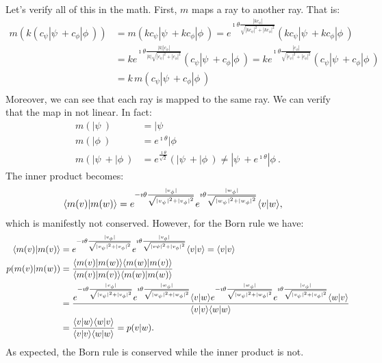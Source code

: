 Let's verify all of this in the math. First, $m$ maps a ray to another ray. That is:
\begin{equation}
	\begin{aligned}
	m(k(c_{\psi} | \psi \> + c_{\phi} | \phi \>)) &= m(kc_{\psi} | \psi \> + k c_{\phi} | \phi \>) = e^{\imath \theta \frac{|kc_{\phi}|}{\sqrt{|kc_{\psi}|^2+|kc_{\phi}|^2}}} ( k c_{\psi} | \psi \> + k c_{\phi}  | \phi \>) \\
	&= k e^{\imath \theta \frac{|k||c_{\phi}|}{|k|\sqrt{|c_{\psi}|^2+|c_{\phi}|^2}}} ( c_{\psi} | \psi \> + c_{\phi}  | \phi \>) = k e^{\imath \theta \frac{|c_{\phi}|}{\sqrt{|c_{\psi}|^2+|c_{\phi}|^2}}} \left( c_{\psi} | \psi \> + c_{\phi}  | \phi \> \right) \\
	&= k \, m(c_{\psi} | \psi \> + c_{\phi} | \phi \>) \\
	\end{aligned}
\end{equation}
Moreover, we can see that each ray is mapped to the same ray. We can verify that the map in not linear. In fact:
\begin{equation}
	\begin{aligned}
		m(|\psi\>) &= |\psi\> \\
		m(|\phi\>) &=  e^{\imath \theta} | \phi \>\\
		m(|\psi\> + |\phi\>) &= e^{\frac{\imath \theta}{\sqrt{2}}}( |\psi\> +  | \phi \>) \neq |\psi\> + e^{\imath \theta} | \phi \>.
	\end{aligned}
\end{equation}
The inner product becomes:
\begin{equation}
	\begin{aligned}
	\langle m(v) | m(w) \rangle &= e^{-\imath \theta \frac{|v_{\phi}|}{\sqrt{|v_{\psi}|^2+|v_{\phi}|^2}}} e^{\imath \theta \frac{|w_{\phi}|}{\sqrt{|w_{\psi}|^2+|w_{\phi}|^2}}} \langle v | w \rangle,
	\end{aligned}
\end{equation}
which is manifestly not conserved. However, for the Born rule we have:
\begin{equation}
	\begin{aligned}
		\langle m(v) | m(v) \rangle &= e^{-\imath \theta \frac{|v_{\phi}|}{\sqrt{|v_{\psi}|^2+|v_{\phi}|^2}}} e^{\imath \theta \frac{|v_{\phi}|}{\sqrt{|v{\psi}|^2+|v_{\phi}|^2}}} \langle v | v \rangle = \langle v | v \rangle \\
	p(m(v)|m(w)) &= \frac{\langle m(v) | m(w) \rangle\langle m(w) | m(v) \rangle}{\langle m(v) | m(v) \rangle\langle m(w) | m(w) \rangle} \\
	&= \frac{e^{-\imath \theta \frac{|v_{\phi}|}{\sqrt{|v_{\psi}|^2+|v_{\phi}|^2}}} e^{\imath \theta \frac{|w_{\phi}|}{\sqrt{|w_{\psi}|^2+|w_{\phi}|^2}}} \langle v | w \rangle e^{-\imath \theta \frac{|w_{\phi}|}{\sqrt{|w_{\psi}|^2+|w_{\phi}|^2}}}e^{\imath \theta \frac{|v_{\phi}|}{\sqrt{|v_{\psi}|^2+|v_{\phi}|^2}}}  \langle w | v \rangle}{\langle v | v \rangle\langle w | w \rangle} \\
		&= \frac{\langle v | w \rangle\langle w | v \rangle}{\langle v | v \rangle\langle w | w \rangle} = p(v|w).
	\end{aligned}
\end{equation}
As expected, the Born rule is conserved while the inner product is not.

